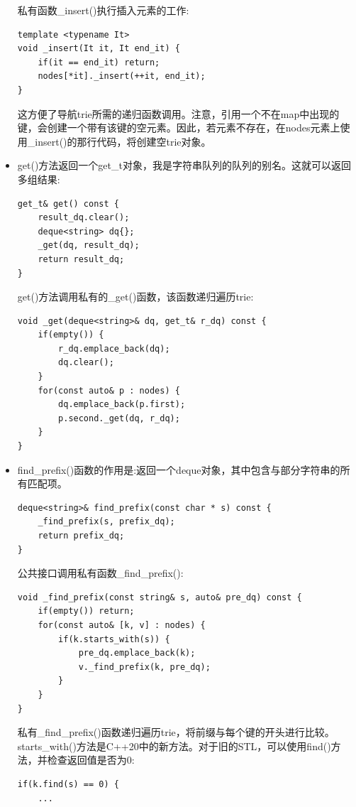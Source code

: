 \begin{itemize}
私有函数\_insert()执行插入元素的工作:

\begin{lstlisting}[style=styleCXX]
template <typename It>
void _insert(It it, It end_it) {
	if(it == end_it) return;
	nodes[*it]._insert(++it, end_it);
}
\end{lstlisting}

这方便了导航trie所需的递归函数调用。注意，引用一个不在map中出现的键，会创建一个带有该键的空元素。因此，若元素不存在，在nodes元素上使用\_insert()的那行代码，将创建空trie对象。

\item 
get()方法返回一个get\_t对象，我是字符串队列的队列的别名。这就可以返回多组结果:

\begin{lstlisting}[style=styleCXX]
get_t& get() const {
	result_dq.clear();
	deque<string> dq{};
	_get(dq, result_dq);
	return result_dq;
}
\end{lstlisting}

get()方法调用私有的\_get()函数，该函数递归遍历trie:

\begin{lstlisting}[style=styleCXX]
void _get(deque<string>& dq, get_t& r_dq) const {
	if(empty()) {
		r_dq.emplace_back(dq);
		dq.clear();
	}
	for(const auto& p : nodes) {
		dq.emplace_back(p.first);
		p.second._get(dq, r_dq);
	}
}
\end{lstlisting}

\item 
find\_prefix()函数的作用是:返回一个deque对象，其中包含与部分字符串的所有匹配项。

\begin{lstlisting}[style=styleCXX]
deque<string>& find_prefix(const char * s) const {
	_find_prefix(s, prefix_dq);
	return prefix_dq;
}
\end{lstlisting}

公共接口调用私有函数\_find\_prefix():

\begin{lstlisting}[style=styleCXX]
void _find_prefix(const string& s, auto& pre_dq) const {
	if(empty()) return;
	for(const auto& [k, v] : nodes) {
		if(k.starts_with(s)) {
			pre_dq.emplace_back(k);
			v._find_prefix(k, pre_dq);
		}
	}
}
\end{lstlisting}

私有\_find\_prefix()函数递归遍历trie，将前缀与每个键的开头进行比较。starts\_with()方法是C++20中的新方法。对于旧的STL，可以使用find()方法，并检查返回值是否为0:

\begin{lstlisting}[style=styleCXX]
if(k.find(s) == 0) {
	...
\end{lstlisting}


\end{itemize}
